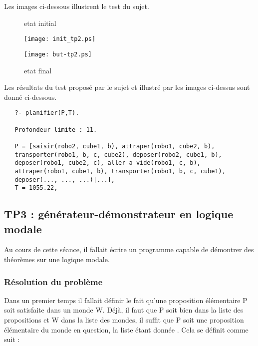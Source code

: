 \documentclass[a4paper,10pt]{article}
\begin{document}
   Les images ci-dessous illustrent le test du sujet.
   
   \begin{figure}[h]
   \begin{minipage}[c]{.46\linewidth}
     \begin{center}
      \caption{etat initial}
      \texttt{[image: init\_tp2.ps]} 
     \end{center}
   \end{minipage} \hfill
   \begin{minipage}[c]{.46\linewidth}
     \begin{center}   
      \caption{etat final}
      \texttt{[image: but-tp2.ps]}
     \end{center}
   \end{minipage}
   \end{figure}

   Les r\'{e}sultats du test propos\'{e} par le sujet et illustr\'{e} par les images ci-dessus sont donn\'{e} ci-dessous.
   
   \begin{lstlisting}
   ?- planifier(P,T).

   Profondeur limite : 11.

   P = [saisir(robo2, cube1, b), attraper(robo1, cube2, b), 
   transporter(robo1, b, c, cube2), deposer(robo2, cube1, b), 
   deposer(robo1, cube2, c), aller_a_vide(robo1, c, b), 
   attraper(robo1, cube1, b), transporter(robo1, b, c, cube1), 
   deposer(..., ..., ...)|...],
   T = 1055.22,
   \end{lstlisting}
   
  \subsection{TP3 : g\'{e}n\'{e}rateur-d\'{e}monstrateur en logique modale}
  Au cours de cette s\'{e}ance, il fallait \'{e}crire un programme capable de d\'{e}montrer des th\'{e}or\`{e}mes sur une logique modale.
  
   \subsubsection{R\'{e}solution du probl\`{e}me}
   Dans un premier temps il fallait d\'{e}finir le fait qu'une proposition \'{e}l\'{e}mentaire P soit satisfaite dans un monde W. D\'{e}j\`{a}, il faut que P soit bien dans 
   la liste des propositions et W dans la liste des mondes, il suffit que P soit une proposition \'{e}l\'{e}mentaire du monde en question,
   la liste \'{e}tant donn\'{e}e . Cela se d\'{e}finit comme suit :
   
\end{document}
